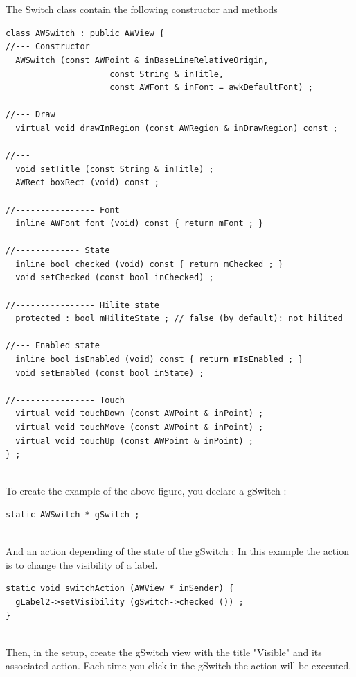 \documentclass[a4paper,11pt]{extarticle}
\begin{document}
~\\

~\\ The Switch class contain the following constructor and methods

\begin{lstlisting}[language=Arduinonl]
class AWSwitch : public AWView {
//--- Constructor
  AWSwitch (const AWPoint & inBaseLineRelativeOrigin,
                     const String & inTitle,
                     const AWFont & inFont = awkDefaultFont) ;

//--- Draw
  virtual void drawInRegion (const AWRegion & inDrawRegion) const ;

//---
  void setTitle (const String & inTitle) ;
  AWRect boxRect (void) const ;

//---------------- Font
  inline AWFont font (void) const { return mFont ; }

//------------- State
  inline bool checked (void) const { return mChecked ; }
  void setChecked (const bool inChecked) ;

//---------------- Hilite state
  protected : bool mHiliteState ; // false (by default): not hilited

//--- Enabled state
  inline bool isEnabled (void) const { return mIsEnabled ; }
  void setEnabled (const bool inState) ;

//---------------- Touch
  virtual void touchDown (const AWPoint & inPoint) ;
  virtual void touchMove (const AWPoint & inPoint) ;
  virtual void touchUp (const AWPoint & inPoint) ;
} ;
\end{lstlisting}

~\\ To create the example of the above figure, you declare a gSwitch :

\begin{lstlisting}[language=Arduinonl]
static AWSwitch * gSwitch ;
\end{lstlisting}

~\\ And an action depending of the state of the gSwitch : In this example the action is to change the visibility of a label.

\begin{lstlisting}[language=Arduinonl]
static void switchAction (AWView * inSender) {
  gLabel2->setVisibility (gSwitch->checked ()) ;
}
\end{lstlisting}

~\\ Then, in the setup, create the gSwitch view with the title "Visible" and its associated action. Each time you click in the gSwitch the action will be executed.
\end{document}

